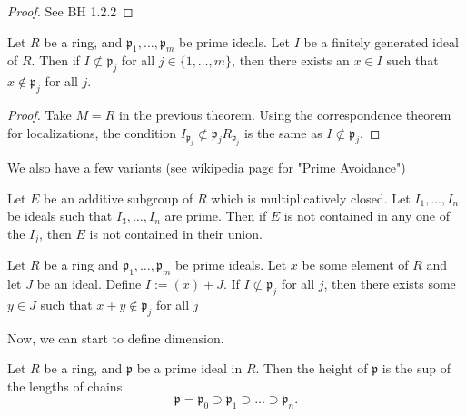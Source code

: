\begin{proof}
    See BH 1.2.2
\end{proof}

\begin{corollary}
    \label{cor:prime_avoidance_ring}
    Let \(R\) be a ring, and \(\mathfrak{p}_{1}, \ldots, \mathfrak{p}_{m}\)
    be prime ideals. 
    Let \(I\) be a finitely generated ideal of \(R\).
    Then if \(I \not\subset \mathfrak{p}_{j}\) for all
    \(j \in \{1, \ldots, m\}\),
    then there exists an \(x \in I\)
    such that \(x \not\in \mathfrak{p}_{j}\) for all \(j\).
\end{corollary}

\begin{proof}
    Take \(M = R\) in the previous theorem.
    Using the correspondence theorem for localizations, 
    the condition \(I_{\mathfrak{p}_{j}} \not\subset \mathfrak{p}_{j}R_{\mathfrak{p}_{j}}\)
    is the same as \(I \not\subset \mathfrak{p}_{j}\).
\end{proof}

We also have a few variants (see wikipedia page for "Prime Avoidance")

\begin{lemma}
    Let \(E\) be an additive subgroup of \(R\) which is multiplicatively closed.
    Let \(I_{1}, \ldots, I_{n}\) be ideals such that \(I_{3}, \ldots, I_{n}\) are prime.
    Then if \(E\) is not contained in any one of the \(I_{j}\), then \(E\) is not
    contained in their union.
\end{lemma}

\begin{lemma}
    Let \(R\) be a ring and \(\mathfrak{p}_{1}, \ldots, \mathfrak{p}_{m}\)
    be prime ideals.
    Let \(x\) be some element of \(R\) and let \(J\) be an ideal.
    Define \(I := (x) + J\).
    If \(I \not\subset \mathfrak{p}_{j}\) for all \(j\),
    then
    there exists some \(y \in J\) such that
    \(x + y \not\in \mathfrak{p}_{j}\) for all \(j\)
\end{lemma}

Now, we can start to define dimension.

\begin{definition}
  \label{def:height_prime_ideal}
  Let $R$ be a ring, and $\mathfrak{p}$
  be a prime ideal in $R$.
  Then the height of $\mathfrak{p}$ is the sup of
  the lengths of chains
  \[
    \mathfrak{p} = \mathfrak{p}_0 \supset \mathfrak{p}_1 \supset \dots \supset \mathfrak{p}_n
   . \]
\end{definition}



